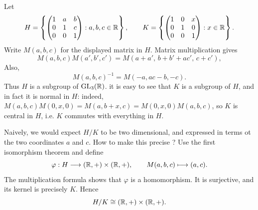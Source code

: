 \documentclass[reqno,11pt]{amsart}
\begin{document}
\begin{example}
Let
\[
  H=\left\{
   \begin{pmatrix}1&a&b\\0&1&c\\0&0&1\end{pmatrix}
   :a,b,c\in\mathbb{R}\right\},\qquad
  K=\left\{
   \begin{pmatrix}1&0&x\\0&1&0\\0&0&1\end{pmatrix}
   :x\in\mathbb{R}\right\}.
\]
Write $M(a,b,c)$ for the displayed matrix in $H$.
Matrix multiplication gives
\[
  M(a,b,c)M(a',b',c')
  =M(a+a',\,b+b'+ac',\,c+c'),
\]
Also,
\[
  M(a,b,c)^{-1}=M(-a,ac-b,-c).
\]
Thus $H$ is a subgroup of $\operatorname{GL}_3(\mathbb{R})$. it is easy to see that $K$ is a subgroup of $H$, and in fact it is normal in $H$: indeed,
$M(a,b,c)M(0,x,0)=M(a,b+x,c)=M(0,x,0)M(a,b,c)$,
so $K$ is central in $H$, i.e. $K$ commutes with everything in $H$. 

Naively, we would expect $H/K$ to be two dimensional, and expressed in terms ot the two coordinates $a$ and $c$. How to make this precise ? Use the first isomorphism theorem and define
\[
  \varphi:H\longrightarrow (\mathbb{R},+)\times(\mathbb{R},+),
  \qquad M(a,b,c)\longmapsto(a,c).
\]
The multiplication formula shows that $\varphi$ is a homomorphism.
It is surjective, and its kernel is precisely $K$. Hence
\[
  H/K\cong(\mathbb{R},+)\times(\mathbb{R},+).
\]
\end{example}
\end{document}
